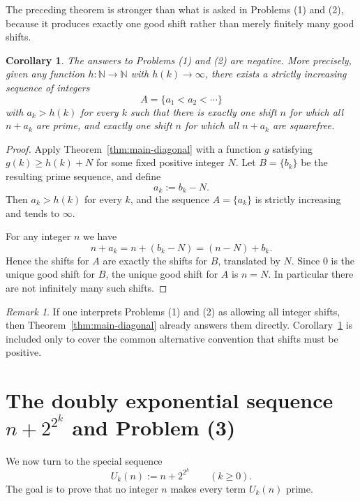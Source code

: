 \documentclass[11pt]{article}
\newtheorem{corollary}[theorem]{Corollary}
\theoremstyle{remark}
\newtheorem{remark}[theorem]{Remark}
\begin{document}
        The preceding theorem is stronger than what is asked in Problems \textup{(1)} and \textup{(2)}, because it produces exactly one good shift rather than merely finitely many good shifts.

        \begin{corollary}\label{cor:12-negative}
          The answers to Problems \textup{(1)} and \textup{(2)} are negative. More precisely, given any function $h\colon \mathbb N\to\mathbb N$ with $h(k)\to\infty$, there exists a strictly increasing sequence of integers
          \[
            A=\{a_1<a_2<\cdots\}
          \]
          with $a_k>h(k)$ for every $k$ such that there is exactly one shift $n$ for which all $n+a_k$ are prime, and exactly one shift $n$ for which all $n+a_k$ are squarefree.
        \end{corollary}

        \begin{proof}
          Apply Theorem~\ref{thm:main-diagonal} with a function $g$ satisfying $g(k)\ge h(k)+N$ for some fixed positive integer $N$. Let $B=\{b_k\}$ be the resulting prime sequence, and define
          \[
            a_k:=b_k-N.
          \]
          Then $a_k>h(k)$ for every $k$, and the sequence $A=\{a_k\}$ is strictly increasing and tends to $\infty$.

          For any integer $n$ we have
          \[
            n+a_k=n+(b_k-N)=(n-N)+b_k.
          \]
          Hence the shifts for $A$ are exactly the shifts for $B$, translated by $N$. Since $0$ is the unique good shift for $B$, the unique good shift for $A$ is $n=N$. In particular there are not infinitely many such shifts.
        \end{proof}

        \begin{remark}
          If one interprets Problems \textup{(1)} and \textup{(2)} as allowing all integer shifts, then Theorem~\ref{thm:main-diagonal} already answers them directly. Corollary~\ref{cor:12-negative} is included only to cover the common alternative convention that shifts must be positive.
        \end{remark}

        \section[The doubly exponential sequence n plus 2 raised to 2 to the k and Problem (3)]{The doubly exponential sequence $n+2^{2^k}$ and Problem (3)}

        We now turn to the special sequence
        \[
          U_k(n):=n+2^{2^k}\qquad (k\ge 0).
        \]
        The goal is to prove that no integer $n$ makes every term $U_k(n)$ prime.
\end{document}
